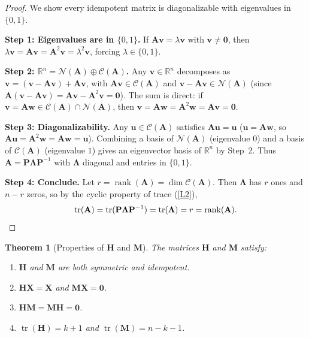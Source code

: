\documentclass[14pt]{extarticle}
\theoremstyle{plain}
\newtheorem{theorem}{Theorem}[section]
\theoremstyle{definition}
\theoremstyle{remark}
\DeclareMathOperator\tr{tr}
\DeclareMathOperator\rank{rank}
\newcommand{\bX}{\mathbf{X}}
\newcommand{\bH}{\mathbf{H}}
\newcommand{\bM}{\mathbf{M}}
\newcommand{\bzero}{\mathbf{0}}
\newcommand{\bA}{\mathbf{A}}
\newcommand{\bP}{\mathbf{P}}
\newcommand{\Real}{\mathbb{R}}
\newcommand{\calC}{\mathcal{C}}
\begin{document}
\begin{proof}
We show every idempotent matrix is diagonalizable with eigenvalues in $\{0, 1\}$.

\textbf{Step 1: Eigenvalues are in $\{0, 1\}$.} If $\bA\mathbf{v} = \lambda\mathbf{v}$ with $\mathbf{v} \neq \bzero$, then $\lambda\mathbf{v} = \bA\mathbf{v} = \bA^2\mathbf{v} = \lambda^2\mathbf{v}$, forcing $\lambda \in \{0, 1\}$.

\textbf{Step 2: $\Real^n = \mathcal{N}(\bA) \oplus \calC(\bA)$.} Any $\mathbf{v} \in \Real^n$ decomposes as $\mathbf{v} = (\mathbf{v} - \bA\mathbf{v}) + \bA\mathbf{v}$, with $\bA\mathbf{v} \in \calC(\bA)$ and $\mathbf{v} - \bA\mathbf{v} \in \mathcal{N}(\bA)$ (since $\bA(\mathbf{v} - \bA\mathbf{v}) = \bA\mathbf{v} - \bA^2\mathbf{v} = \bzero$). The sum is direct: if $\mathbf{v} = \bA\mathbf{w} \in \calC(\bA) \cap \mathcal{N}(\bA)$, then $\mathbf{v} = \bA\mathbf{w} = \bA^2\mathbf{w} = \bA\mathbf{v} = \bzero$.

\textbf{Step 3: Diagonalizability.} Any $\mathbf{u} \in \calC(\bA)$ satisfies $\bA\mathbf{u} = \mathbf{u}$ ($\mathbf{u} = \bA\mathbf{w}$, so $\bA\mathbf{u} = \bA^2\mathbf{w} = \bA\mathbf{w} = \mathbf{u}$). Combining a basis of $\mathcal{N}(\bA)$ (eigenvalue $0$) and a basis of $\calC(\bA)$ (eigenvalue $1$) gives an eigenvector basis of $\Real^n$ by Step~2. Thus $\bA = \bP\boldsymbol\Lambda\bP^{-1}$ with $\boldsymbol\Lambda$ diagonal and entries in $\{0, 1\}$.

\textbf{Step 4: Conclude.} Let $r = \rank(\bA) = \dim\calC(\bA)$. Then $\boldsymbol\Lambda$ has $r$ ones and $n-r$ zeros, so by the cyclic property of trace (\ref{L2}),
\[
\tr(\bA) = \tr(\bP\boldsymbol\Lambda\bP^{-1}) = \tr(\boldsymbol\Lambda) = r = \rank(\bA). \qedhere
\]
\end{proof}

\begin{theorem}[Properties of $\bH$ and $\bM$]\label{thm:HM}
The matrices $\bH$ and $\bM$ satisfy:
\begin{enumerate}[label=\textup{(\roman*)}]
\item\label{HM:i} $\bH$ and $\bM$ are both symmetric and idempotent.
\item\label{HM:ii} $\bH\bX = \bX$ and $\bM\bX = \bzero$.
\item\label{HM:iii} $\bH\bM = \bM\bH = \bzero$.
\item\label{HM:iv} $\tr(\bH) = k + 1$ and $\tr(\bM) = n - k - 1$.
\end{enumerate}
\end{theorem}
\end{document}
